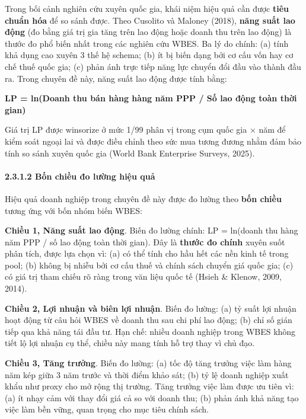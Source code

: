 \documentclass[12pt,a4paper]{article}
\begin{document}
Trong bối cảnh nghiên cứu xuyên quốc gia, khái niệm hiệu quả cần được
\textbf{tiêu chuẩn hóa} để so sánh được. Theo Cusolito và Maloney
(2018), \textbf{năng suất lao động} (đo bằng giá trị gia tăng trên lao
động hoặc doanh thu trên lao động) là thước đo phổ biến nhất trong các
nghiên cứu WBES. Ba lý do chính: (a) tính khả dụng cao xuyên 3 thế hệ
schema; (b) ít bị biến dạng bởi cơ cấu vốn hay cơ chế thuế quốc gia; (c)
phản ánh trực tiếp năng lực chuyển đổi đầu vào thành đầu ra. Trong
chuyên đề này, năng suất lao động được tính bằng:

\textbf{LP = ln(Doanh thu bán hàng hàng năm PPP / Số lao động toàn thời
gian)}

Giá trị LP được winsorize ở mức 1/99 phân vị trong cụm quốc gia × năm để
kiểm soát ngoại lai và được điều chỉnh theo sức mua tương đương nhằm đảm
bảo tính so sánh xuyên quốc gia (World Bank Enterprise Surveys, 2025).

\hypertarget{2312-bux1ed1n-chiux1ec1u-ux111o-lux1b0ux1eddng-hiux1ec7u-quux1ea3}{%
\paragraph{2.3.1.2 Bốn chiều đo lường hiệu
quả}\label{2312-bux1ed1n-chiux1ec1u-ux111o-lux1b0ux1eddng-hiux1ec7u-quux1ea3}}

Hiệu quả doanh nghiệp trong chuyên đề này được đo lường theo \textbf{bốn
chiều} tương ứng với bốn nhóm biến WBES:

\textbf{Chiều 1, Năng suất lao động}. Biến đo lường chính: LP = ln(doanh
thu hàng năm PPP / số lao động toàn thời gian). Đây là \textbf{thước đo
chính} xuyên suốt phân tích, được lựa chọn vì: (a) có thể tính cho hầu
hết các nền kinh tế trong pool; (b) không bị nhiễu bởi cơ cấu thuế và
chính sách chuyển giá quốc gia; (c) có giá trị tham chiếu rõ ràng trong
văn liệu quốc tế (Hsieh \& Klenow, 2009, 2014).

\textbf{Chiều 2, Lợi nhuận và biên lợi nhuận}. Biến đo lường: (a) tỷ
suất lợi nhuận hoạt động từ câu hỏi WBES về doanh thu sau chi phí lao
động; (b) chỉ số gián tiếp qua khả năng tái đầu tư. Hạn chế: nhiều doanh
nghiệp trong WBES không tiết lộ lợi nhuận cụ thể, chiều này mang tính hỗ
trợ thay vì chủ đạo.

\textbf{Chiều 3, Tăng trưởng}. Biến đo lường: (a) tốc độ tăng trưởng
việc làm hàng năm kép giữa 3 năm trước và thời điểm khảo sát; (b) tỷ lệ
doanh nghiệp xuất khẩu như proxy cho mở rộng thị trường. Tăng trưởng
việc làm được ưu tiên vì: (a) ít nhạy cảm với thay đổi giá cả so với
doanh thu; (b) phản ánh khả năng tạo việc làm bền vững, quan trọng cho
mục tiêu chính sách.
\end{document}
